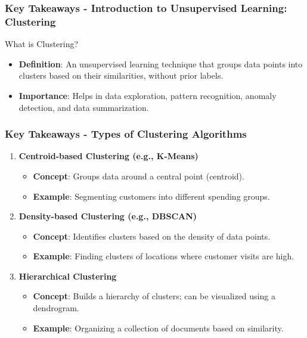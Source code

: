 \documentclass[aspectratio=169]{beamer}
\begin{document}
\begin{frame}[fragile]
    \frametitle{Key Takeaways - Introduction to Unsupervised Learning: Clustering}
    \begin{block}{What is Clustering?}
        \begin{itemize}
            \item \textbf{Definition}: An unsupervised learning technique that groups data points into clusters based on their similarities, without prior labels.
            \item \textbf{Importance}: Helps in data exploration, pattern recognition, anomaly detection, and data summarization.
        \end{itemize}
    \end{block}
\end{frame}

\begin{frame}[fragile]
    \frametitle{Key Takeaways - Types of Clustering Algorithms}
    \begin{enumerate}
        \item \textbf{Centroid-based Clustering (e.g., K-Means)}
            \begin{itemize}
                \item \textbf{Concept}: Groups data around a central point (centroid).
                \item \textbf{Example}: Segmenting customers into different spending groups.
            \end{itemize}
            
        \item \textbf{Density-based Clustering (e.g., DBSCAN)}
            \begin{itemize}
                \item \textbf{Concept}: Identifies clusters based on the density of data points.
                \item \textbf{Example}: Finding clusters of locations where customer visits are high.
            \end{itemize}
            
        \item \textbf{Hierarchical Clustering}
            \begin{itemize}
                \item \textbf{Concept}: Builds a hierarchy of clusters; can be visualized using a dendrogram.
                \item \textbf{Example}: Organizing a collection of documents based on similarity.
            \end{itemize}
    \end{enumerate}
\end{frame}
\end{document}
